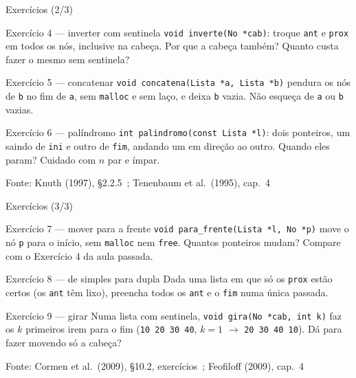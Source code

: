 \documentclass[aspectratio=169]{beamer}
\newcommand{\fonte}[1]{\vfill\hfill{\scriptsize\textcolor{UFSGray}{Fonte: #1}}}
\begin{document}
\begin{frame}{Exercícios (2/3)}
  \footnotesize
  \begin{block}{Exercício 4 --- inverter com sentinela}
    \texttt{void inverte(No *cab)}: troque \texttt{ant} e \texttt{prox} em
    todos os nós, inclusive na cabeça. Por que a cabeça também? Quanto
    custa fazer o mesmo sem sentinela?
  \end{block}
  \begin{block}{Exercício 5 --- concatenar}
    \texttt{void concatena(Lista *a, Lista *b)} pendura os nós de
    \texttt{b} no fim de \texttt{a}, sem \texttt{malloc} e sem laço, e
    deixa \texttt{b} vazia. Não esqueça de \texttt{a} ou \texttt{b} vazias.
  \end{block}
  \begin{block}{Exercício 6 --- palíndromo}
    \texttt{int palindromo(const Lista *l)}: dois ponteiros, um saindo de
    \texttt{ini} e outro de \texttt{fim}, andando um em direção ao outro.
    Quando eles param? Cuidado com $n$ par e ímpar.
  \end{block}
  \fonte{Knuth (1997), §2.2.5~\cite{knuth1997art};
    Tenenbaum et al.\ (1995), cap.~4~\cite{tenenbaum1995estruturas}}
\end{frame}

\begin{frame}{Exercícios (3/3)}
  \footnotesize
  \begin{block}{Exercício 7 --- mover para a frente}
    \texttt{void para\_frente(Lista *l, No *p)} move o nó \texttt{p} para o
    início, sem \texttt{malloc} nem \texttt{free}. Quantos ponteiros mudam?
    Compare com o Exercício 4 da aula passada.
  \end{block}
  \begin{block}{Exercício 8 --- de simples para dupla}
    Dada uma lista em que só os \texttt{prox} estão certos (os
    \texttt{ant} têm lixo), preencha todos os \texttt{ant} e o
    \texttt{fim} numa única passada.
  \end{block}
  \begin{block}{Exercício 9 --- girar}
    Numa lista com sentinela, \texttt{void gira(No *cab, int k)} faz os
    $k$ primeiros irem para o fim (\texttt{10 20 30 40}, $k=1$ $\to$
    \texttt{20 30 40 10}). Dá para fazer movendo só a cabeça?
  \end{block}
  \fonte{Cormen et al.\ (2009), §10.2, exercícios~\cite{cormen2009introduction};
    Feofiloff (2009), cap.~4~\cite{feofiloff2009algoritmos}}
\end{frame}
\end{document}
